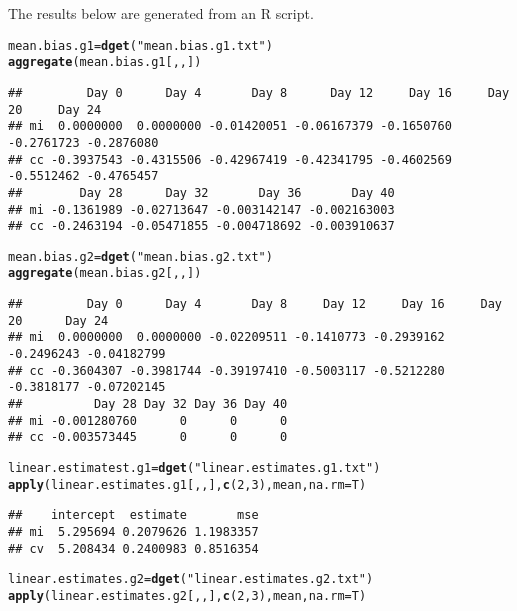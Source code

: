 \documentclass{article}\usepackage[]{graphicx}\usepackage[]{color}
\makeatletter
\newcommand{\hlnum}[1]{\textcolor[rgb]{0.686,0.059,0.569}{#1}}%
\newcommand{\hlstr}[1]{\textcolor[rgb]{0.192,0.494,0.8}{#1}}%
\newcommand{\hlstd}[1]{\textcolor[rgb]{0.345,0.345,0.345}{#1}}%
\newcommand{\hlkwb}[1]{\textcolor[rgb]{0.69,0.353,0.396}{#1}}%
\newcommand{\hlkwc}[1]{\textcolor[rgb]{0.333,0.667,0.333}{#1}}%
\newcommand{\hlkwd}[1]{\textcolor[rgb]{0.737,0.353,0.396}{\textbf{#1}}}%
\newenvironment{kframe}{%
 \def\at@end@of@kframe{}%
 \ifinner\ifhmode%
  \def\at@end@of@kframe{\end{minipage}}%
  \begin{minipage}{\columnwidth}%
 \fi\fi%
 \def\FrameCommand##1{\hskip\@totalleftmargin \hskip-\fboxsep
 \colorbox{shadecolor}{##1}\hskip-\fboxsep
     \hskip-\linewidth \hskip-\@totalleftmargin \hskip\columnwidth}%
 \MakeFramed {\advance\hsize-\width
   \@totalleftmargin\z@ \linewidth\hsize
   \@setminipage}}%
 {\par\unskip\endMakeFramed%
 \at@end@of@kframe}
\newenvironment{knitrout}{}{} %
\makeatother
\begin{document}
The results below are generated from an R script.

\begin{knitrout}
\color{fgcolor}\begin{kframe}
\begin{alltt}
\hlstd{mean.bias.g1} \hlkwb{=} \hlkwd{dget}\hlstd{(}\hlstr{"mean.bias.g1.txt"}\hlstd{)}
\hlkwd{aggregate}\hlstd{(mean.bias.g1[,,])}
\end{alltt}
\begin{verbatim}
##         Day 0      Day 4       Day 8      Day 12     Day 16     Day 20     Day 24
## mi  0.0000000  0.0000000 -0.01420051 -0.06167379 -0.1650760 -0.2761723 -0.2876080
## cc -0.3937543 -0.4315506 -0.42967419 -0.42341795 -0.4602569 -0.5512462 -0.4765457
##        Day 28      Day 32       Day 36       Day 40
## mi -0.1361989 -0.02713647 -0.003142147 -0.002163003
## cc -0.2463194 -0.05471855 -0.004718692 -0.003910637
\end{verbatim}
\begin{alltt}
\hlstd{mean.bias.g2} \hlkwb{=} \hlkwd{dget}\hlstd{(}\hlstr{"mean.bias.g2.txt"}\hlstd{)}
\hlkwd{aggregate}\hlstd{(mean.bias.g2[,,])}
\end{alltt}
\begin{verbatim}
##         Day 0      Day 4       Day 8     Day 12     Day 16     Day 20      Day 24
## mi  0.0000000  0.0000000 -0.02209511 -0.1410773 -0.2939162 -0.2496243 -0.04182799
## cc -0.3604307 -0.3981744 -0.39197410 -0.5003117 -0.5212280 -0.3818177 -0.07202145
##          Day 28 Day 32 Day 36 Day 40
## mi -0.001280760      0      0      0
## cc -0.003573445      0      0      0
\end{verbatim}
\begin{alltt}
\hlstd{linear.estimatest.g1}\hlkwb{=} \hlkwd{dget}\hlstd{(}\hlstr{"linear.estimates.g1.txt"}\hlstd{)}
\hlkwd{apply}\hlstd{(linear.estimates.g1[,,],}\hlkwd{c}\hlstd{(}\hlnum{2}\hlstd{,}\hlnum{3}\hlstd{),mean,} \hlkwc{na.rm}\hlstd{=T)}
\end{alltt}
\begin{verbatim}
##    intercept  estimate       mse
## mi  5.295694 0.2079626 1.1983357
## cv  5.208434 0.2400983 0.8516354
\end{verbatim}
\begin{alltt}
\hlstd{linear.estimates.g2} \hlkwb{=} \hlkwd{dget}\hlstd{(}\hlstr{"linear.estimates.g2.txt"}\hlstd{)}
\hlkwd{apply}\hlstd{(linear.estimates.g2[,,],}\hlkwd{c}\hlstd{(}\hlnum{2}\hlstd{,}\hlnum{3}\hlstd{),mean,} \hlkwc{na.rm}\hlstd{=T)}

\end{alltt}
\end{kframe}
\end{knitrout}
\end{document}
